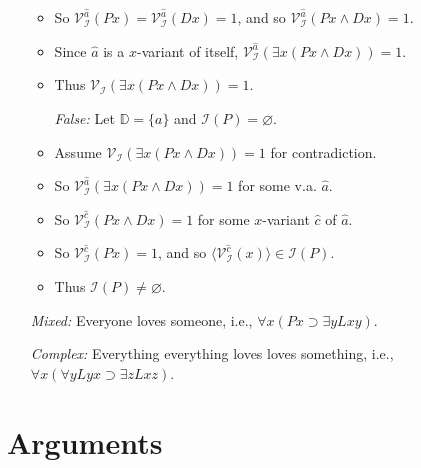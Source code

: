 \documentclass[a4paper, 11pt]{article} %
\newcommand{\tuple}[1]{\langle#1\rangle} %
\newcommand{\set}[1]{\lbrace#1\rbrace} %
\newcommand{\I}{\mathcal{I}}
\newcommand{\D}{\mathbb{D}}
\newcommand{\VV}[2]{\mathcal{V}_{#1}^{#2}} %
\begin{document}
\begin{enumerate}
\begin{itemize}
      \item So $\VV{\I}{\hat{a}}(Px)=\VV{\I}{\hat{a}}(Dx)=1$, and so $\VV{\I}{\hat{a}}(Px \wedge Dx)=1$.
      \item Since $\hat{a}$ is a $x$-variant of itself, $\VV{\I}{\hat{a}}(\exists x(Px \wedge Dx))=1$.
      \item Thus $\VV{\I}{}(\exists x(Px \wedge Dx))=1$.
      \item[\it False:] Let $\D=\set{a}$ and $\I(P)=\varnothing$.
      \item Assume $\VV{\I}{}(\exists x(Px \wedge Dx))=1$ for contradiction.
      \item So $\VV{\I}{\hat{a}}(\exists x(Px \wedge Dx))=1$ for some v.a. $\hat{a}$.
      \item So $\VV{\I}{\hat{c}}(Px \wedge Dx)= 1$ for some $x$-variant $\hat{c}$ of $\hat{a}$.
      \item So $\VV{\I}{\hat{c}}(Px)= 1$, and so $\tuple{\VV{\I}{\hat{c}}(x)}\in\I(P)$.
      \item Thus $\I(P)\neq\varnothing$.
    \end{itemize}
  \item[\it Mixed:] Everyone loves someone, i.e., $\forall x(Px \supset \exists yLxy)$. 
  \item[\it Complex:] Everything everything loves loves something, i.e., $\forall x(\forall yLyx \supset \exists zLxz)$.
\end{enumerate}






\section*{Arguments}
\end{document}
